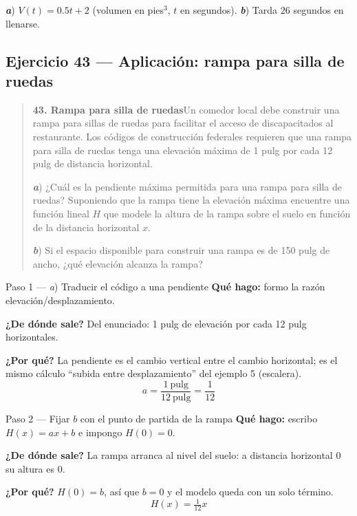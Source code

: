 \documentclass[11pt]{article}
\begin{document}
\begin{resp}
\textbf{\textit{a}}) $V(t)=0.5t+2$ (volumen en pies$^3$, $t$ en segundos). \quad \textbf{\textit{b}}) Tarda $26$ segundos en llenarse.
\end{resp}

\subsection*{Ejercicio 43 — Aplicación: rampa para silla de ruedas}

\begin{quote}
\textbf{43. Rampa para silla de ruedas}\quad Un comedor local debe construir una rampa para sillas de ruedas para facilitar el acceso de discapacitados al restaurante. Los códigos de construcción federales requieren que una rampa para silla de ruedas tenga una elevación máxima de 1 pulg por cada 12 pulg de distancia horizontal.

\textbf{\textit{a}}) ¿Cuál es la pendiente máxima permitida para una rampa para silla de ruedas? Suponiendo que la rampa tiene la elevación máxima encuentre una función lineal $H$ que modele la altura de la rampa sobre el suelo en función de la distancia horizontal $x$.

\textbf{\textit{b}}) Si el espacio disponible para construir una rampa es de 150 pulg de ancho, ¿qué elevación alcanza la rampa?
\end{quote}

\begin{paso}{Paso 1 --- \textit{a}) Traducir el código a una pendiente}
\textbf{Qué hago:} formo la razón elevación/desplazamiento.

\textbf{¿De dónde sale?} Del enunciado: 1 pulg de elevación por cada 12 pulg horizontales.

\textbf{¿Por qué?} La pendiente es el cambio vertical entre el cambio horizontal; es el mismo cálculo ``subida entre desplazamiento'' del ejemplo 5 (escalera).
\[
a=\frac{1\ \text{pulg}}{12\ \text{pulg}}=\frac{1}{12}
\]
\end{paso}

\begin{paso}{Paso 2 --- Fijar $b$ con el punto de partida de la rampa}
\textbf{Qué hago:} escribo $H(x)=ax+b$ e impongo $H(0)=0$.

\textbf{¿De dónde sale?} La rampa arranca al nivel del suelo: a distancia horizontal $0$ su altura es $0$.

\textbf{¿Por qué?} $H(0)=b$, así que $b=0$ y el modelo queda con un solo término.
\[
H(x)=\tfrac{1}{12}x
\]
\end{paso}
\end{document}
